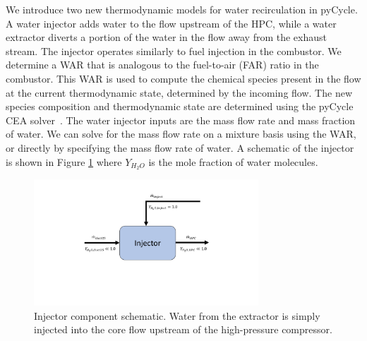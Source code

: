 \documentclass[conf]{new-aiaa}
\begin{document}
We introduce two new thermodynamic models for water recirculation in pyCycle.
A water injector adds water to the flow upstream of the HPC, while a water extractor diverts a portion of the water in the flow away from the exhaust stream.
The injector operates similarly to fuel injection in the combustor.
We determine a WAR that is analogous to the fuel-to-air (FAR) ratio in the combustor.
This WAR is used to compute the chemical species present in the flow at the current thermodynamic state, determined by the incoming flow.
The new species composition and thermodynamic state are determined using the pyCycle CEA solver~\cite{Gray2017b}.
The water injector inputs are the mass flow rate and mass fraction of water.
We can solve for the mass flow rate on a mixture basis using the WAR, or directly by specifying the mass flow rate of water.
A schematic of the injector is shown in Figure \ref{fig:injector} where $Y_{H_2O}$ is the mole fraction of water molecules.

\begin{figure}[hbt!]
    \centering
    \includegraphics[width=0.75\textwidth]{injector.pdf}
    \caption{
        Injector component schematic.
        Water from the extractor is simply injected into the core flow upstream of the high-pressure compressor.
    }
    \label{fig:injector}
\end{figure}
\end{document}
